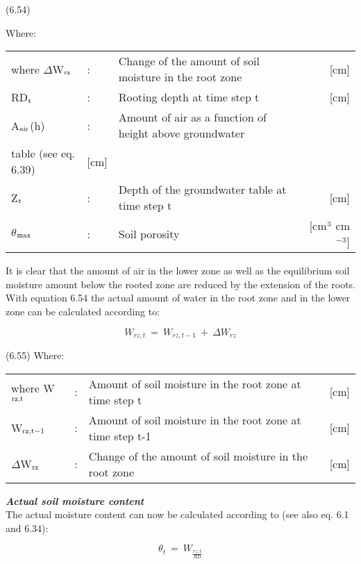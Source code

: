  
\strut\hfill (6.54)


Where:\\
\begin{tabularx}{\textwidth}{llXr}



where $\Delta$W$_{{\rm rz}}$ &:& Change of the amount of soil moisture in the root zone  & [cm]\\
RD$_{{\rm t}}$ &:& Rooting depth at time step t  & [cm]\\
A$_{{\rm air}}$(h) &:& Amount of air as a function of height above groundwater \\
   table  (see eq. 6.39) & [cm]\\
Z$_{{\rm t}}$ &:& Depth of the groundwater table at time step t  & [cm]\\
$\theta$$_{{\rm max}}$ &:& Soil porosity  & [cm$^{{\rm 3}}$ cm$^{{\rm -3}}$]
\end{tabularx}




It is clear that the amount of air in the lower zone as well as the equilibrium soil moisture
amount below the rooted zone are reduced by the extension of the roots. With equation
6.54 the actual amount of water in the root zone and in the lower zone can be calculated
according to:

\begin{equation}
 W _{rz,t} ~=~ W _{rz, t-1} ~+~ \Delta W _{rz} 
\end{equation}

 
\strut\hfill (6.55)
Where:\\
\begin{tabularx}{\textwidth}{llXr}



where W$_{{\rm rz,t}}$ &:& Amount of soil moisture in the root zone at time step t  & [cm]\\
W$_{{\rm rz,t-1}}$ &:& Amount of soil moisture in the root zone at time step t-1  & [cm]\\
$\Delta$W$_{{\rm rz}}$ &:& Change of the amount of soil moisture in the root zone  & [cm]
\end{tabularx}





 {\bf {\it Actual soil moisture content\/}}\\
The actual moisture content can now be calculated according to (see also eq. 6.1 and
6.34):

\begin{equation}
\theta _{t} ~=~ W _{\frac{rz, t}{RD}} 
\end{equation}


